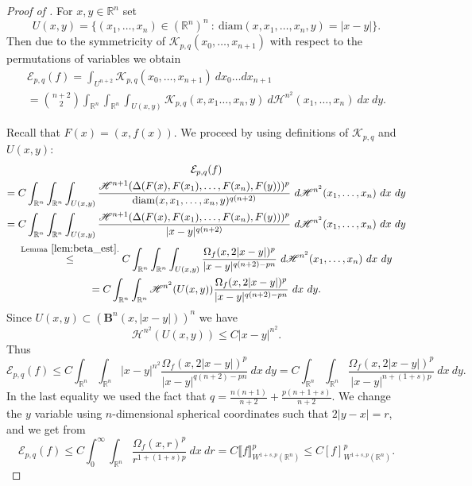 \documentclass[11pt]{amsart}
\newcommand{\R}{\mathbb{R}}
\renewcommand{\H}{\mathscr{H}}
\newcommand{\diam}{\mathrm{diam}}
\newcommand{\Epq}{\mathcal{E}_{p,q}}
\theoremstyle{definition}
\begin{document}
	\begin{proof}[Proof of ]
		For $x,y\in\R^n$ set
		\[U(x,y) = \big\lbrace(x_1,\dots,x_n)\in(\R^n)^n\ :\ \diam(x,x_1,\dots,x_n,y) = |x-y| \big\rbrace.
		\]
		Then due to the symmetricity of $\mathcal{K}_{p,q}(x_0,\dots,x_{n+1})$ with respect to the permutations of variables we obtain
		\begin{multline*}
		\Epq(f) = \int_{U^{n+2}}\mathcal{K}_{p,q}(x_0,\dots,x_{n+1})\ dx_0\dots dx_{n+1}\\
		= {n+2\choose 2}\int_{\R^n}\int_{\R^n}\int_{U(x,y)}\mathcal{K}_{p,q}(x,x_1\dots,x_{n},y)\ d\H^{n^2}(x_1,\dots,x_{n})\ dx\ dy.
		\end{multline*}		
		
		Recall that $F(x)=(x,f(x))$. We proceed by using definitions of $\mathcal{K}_{p,q}$ and $U(x,y)$:
		\begin{multline*}
		\Epq(f) \\= C \int_{\R^n}\int_{\R^n}\int_{U(x,y)}\frac{\H^{n+1}(\Delta(F(x),F(x_1),\dots,F(x_{n}),F(y)))^p}{\diam(x,x_1,\dots,x_n,y)^{q(n+2)}}\ d\H^{n^2}(x_1,\dots,x_{n})\ dx\ dy\\
		=C \int_{\R^n}\int_{\R^n}\int_{U(x,y)}\frac{\H^{n+1}(\Delta(F(x),F(x_1),\dots,F(x_{n}),F(y)))^p}{|x-y|^{q(n+2)}}\ d\H^{n^2}(x_1,\dots,x_{n})\ dx\ dy\\
		\overset{\mathrm{Lemma}\ \ref{lem:beta_est}.}{\leq} C \int_{\R^n}\int_{\R^n}\int_{U(x,y)} \frac{\Omega_f(x,2|x-y|)^p}{|x-y|^{q(n+2)-pn}}\ d\H^{n^2}(x_1,\dots,x_{n})\ dx\ dy\\
		= C\int_{\R^n}\int_{\R^n}\H^{n^2}(U(x,y))\frac{\Omega_f(x,2|x-y|)^p}{|x-y|^{q(n+2)-pn}}\ dx\ dy.
		\end{multline*}
		Since $U(x,y)\subset(\mathbf{B}^{n}(x,|x-y|))^n$ we have
		\[
		\H^{n^2}(U(x,y))\leq C|x-y|^{n^2}.
		\]
		Thus
		\begin{equation*}
		\Epq(f)	\leq C\int_{\R^n}\int_{\R^n}|x-y|^{n^2}\frac{\Omega_f(x,2|x-y|)^p}{|x-y|^{q(n+2)-pn}}\ dx\ dy
		= C\int_{\R^n}\int_{\R^n}\frac{\Omega_f(x,2|x-y|)^p}{|x-y|^{n+(1+s)p}}\ dx\ dy.
		\end{equation*}
		In the last equality we used the fact that $q = \frac{n(n+1)}{n+2} + \frac{p(n+1+s)}{n+2}$. 
		We change the $y$ variable using $n$-dimensional spherical coordinates such that $2|y-x|=r$, and we get from 
		\begin{equation*}
		\Epq(f)\le C\int_0^{\infty}\int_{\R^n}\frac{\Omega_f(x,r)^p}{r^{1+(1+s)p}}\ dx\ dr= C \llbracket f\rrbracket^p_{W^{1+s,p}(\R^n)}\le C[f]^p_{W^{1+s,p}(\R^n)}.
		\end{equation*}
	\end{proof}
\end{document}
